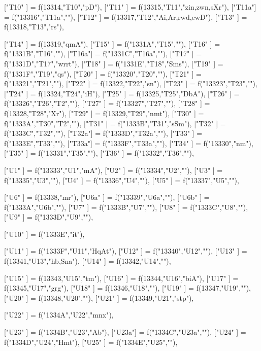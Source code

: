 {["T10" ] = f(13314,"T10","pD"),
["T11" ] = f(13315,"T11","zin,zwn,sXr"),
    ["T11a"] = f("13316","T11a",""),
["T12" ] = f(13317,"T12","Ai,Ar,rwd,ewD"),
["T13" ] = f(13318,"T13","rs"),

["T14" ] = f(13319,"qmA"),
    ["T15" ] = f("1331A","T15",""),
    ["T16" ] = f("1331B","T16",""),
    ["T16a"] = f("1331C","T16a",""),
["T17" ] = f("1331D","T17","wrrt"),
["T18" ] = f("1331E","T18","Sms"),
["T19" ] = f("1331F","T19","qs"),
    ["T20" ] = f("13320","T20",""),
    ["T21" ] = f("13321","T21",""),
["T22" ] = f(13322,"T22","sn"),
    ["T23" ] = f("13323","T23",""),
["T24" ] = f(13324,"T24","iH"),
["T25" ] = f(13325,"T25","DbA"),
    ["T26" ] = f("13326","T26","T2",""),
    ["T27" ] = f("13327","T27",""),
["T28" ] = f(13328,"T28","Xr"),
["T29" ] = f(13329,"T29","nmt"),
    ["T30" ] = f("1333A","T30","T2",""),
["T31" ] = f("1333B","T31","sSm"),
    ["T32" ] = f("1333C","T32",""),
    ["T32a"] = f("1333D","T32a",""),
    ["T33" ] = f("1333E","T33",""),
    ["T33a"] = f("1333F","T33a",""),
["T34" ] = f("13330","nm"),
    ["T35" ] = f("13331","T35",""),
    ["T36" ] = f("13332","T36",""),

["U1"  ] = f("13333","U1","mA"),
["U2"  ] = f("13334","U2",""),
["U3"  ] = f("13335","U3",""),
["U4"  ] = f("13336","U4",""),
["U5"  ] = f("13337","U5",""),

["U6"  ] = f(13338,"mr"),
["U6a" ] = f("13339","U6a",""),
["U6b" ] = f("1333A","U6b",""),
["U7"  ] = f("1333B","U7",""),
["U8"  ] = f("1333C","U8",""),
["U9"  ] = f("1333D","U9",""),

["U10" ] = f("1333E","it"),

["U11" ] = f("1333F","U11","HqAt"),
["U12" ] = f("13340","U12",""),
["U13" ] = f(13341,"U13","hb,Sna"),
["U14" ] = f(13342,"U14",""),

["U15" ] = f(13343,"U15","tm"),
["U16" ] = f(13344,"U16","biA"),
["U17" ] = f(13345,"U17","grg"),
["U18" ] = f(13346,"U18",""),
["U19" ] = f(13347,"U19",""),
["U20" ] = f(13348,"U20",""),
["U21" ] = f(13349,"U21","stp"),

["U22" ] = f("1334A","U22","mnx"),

["U23" ] = f("1334B","U23","Ab"),
["U23a"] = f("1334C","U23a",""),
["U24" ] = f("1334D","U24","Hmt"),
["U25" ] = f("1334E","U25",""),

}
